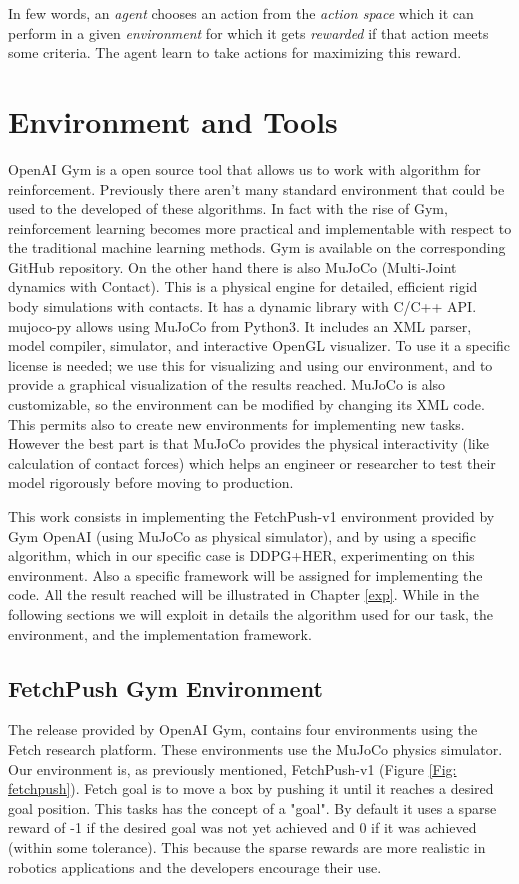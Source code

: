 \documentclass[a4paper]{report}
\begin{document}
In few words, an \textit{agent} chooses an action from the \textit{action space} which it can perform in a given \textit{environment} for which it gets \textit{rewarded} if that action meets some criteria. The agent learn to take actions for maximizing this reward.

\section{Environment and Tools}
 
OpenAI Gym is a open source tool that allows us to work with algorithm for reinforcement. Previously there aren't many standard environment that could be used to the developed of these algorithms. In fact with the rise of Gym, reinforcement learning becomes more practical and implementable with respect to the traditional machine learning methods. Gym is available on the corresponding GitHub repository. On the other hand there is also MuJoCo (Multi-Joint dynamics with Contact). This is a physical engine for detailed, efficient rigid body simulations with contacts. It has a dynamic library with C/C++ API. mujoco-py allows using MuJoCo from Python3. It includes an XML parser, model compiler, simulator, and interactive OpenGL visualizer. To use it a specific license is needed; we use this for visualizing and using our environment, and to provide a graphical visualization of the results reached. MuJoCo is also customizable, so the environment can be modified by changing its XML code. This permits also to create new environments for implementing new tasks. However the best part is that MuJoCo provides the physical interactivity (like calculation of contact forces) which helps an engineer or researcher to test their model rigorously before moving to production.

This work consists in implementing the FetchPush-v1 environment provided by Gym OpenAI (using MuJoCo as physical simulator), and by using a specific algorithm, which in our specific case is DDPG+HER, experimenting on this environment. Also a specific framework will be assigned for  implementing the code. All the result reached will be illustrated in Chapter \ref{exp}. While in the following sections we will exploit in details the algorithm used for our task, the environment, and the implementation framework.

\subsection{FetchPush Gym Environment}
The release provided by OpenAI Gym, contains four environments using the Fetch research platform. These environments use the MuJoCo physics simulator. Our environment is, as previously mentioned, FetchPush-v1 (Figure \ref{Fig: fetchpush}). Fetch goal is to move a box by pushing it until it reaches a desired goal position. This tasks has the concept of a "goal". By default it uses a sparse reward of -1 if the desired goal was not yet achieved and 0 if it was achieved (within some tolerance). This because the sparse rewards are more realistic in robotics applications and the developers encourage their use.
\end{document}
